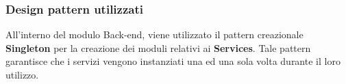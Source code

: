 \subsubsection{Design pattern utilizzati}
All'interno del modulo Back-end, viene utilizzato il pattern creazionale \textbf{Singleton} per la creazione dei moduli relativi ai \textbf{Services}. Tale pattern garantisce che i servizi vengono instanziati una ed una sola volta durante il loro utilizzo. 